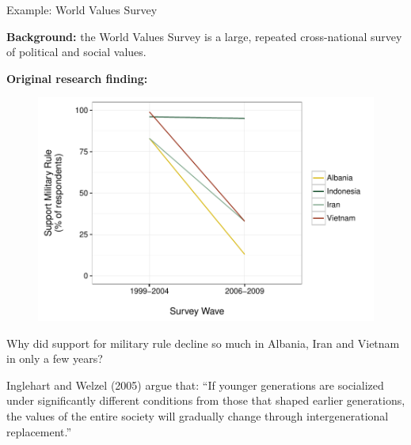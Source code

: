 \documentclass[10pt]{beamer}
\begin{document}
\begin{frame}{Example: World Values Survey}

    \textbf{Background:} the World Values Survey is a large, repeated cross-national survey of political and social values.

    \textbf{Original research finding:}

    \begin{figure}
        \includegraphics[scale=0.5]{img/wvs_compare.pdf}
    \end{figure}

\end{frame}

\begin{frame}

    \begin{center}
        {\large{Why did support for military rule decline so much in Albania, Iran and Vietnam in only a few years?}}

        \vspace{1cm}
    \end{center}

    Inglehart and Welzel (2005) argue that: ``If younger generations are socialized under significantly different conditions from those that shaped earlier generations, the values of the entire society will gradually change through intergenerational replacement.''

\end{frame}
\end{document}

